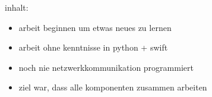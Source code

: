 inhalt:
\begin{itemize}
	\item arbeit beginnen um etwas neues zu lernen
	\item arbeit ohne kenntnisse in python + swift 
	\item noch nie netzwerkkommunikation programmiert
	\item ziel war, dass alle komponenten zusammen arbeiten
	
\end{itemize}